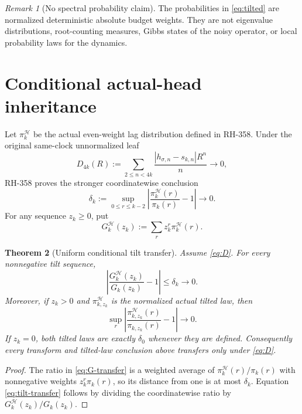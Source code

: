\documentclass[11pt]{article}
\newtheorem{theorem}{Theorem}[section]
\theoremstyle{remark}
\newtheorem{remark}[theorem]{Remark}
\newcommand{\cH}{\mathcal H}
\begin{document}
\begin{remark}[No spectral probability claim]
The probabilities in \eqref{eq:tilted} are normalized deterministic absolute
budget weights.  They are not eigenvalue distributions, root-counting
measures, Gibbs states of the noisy operator, or local probability laws for
the dynamics.
\end{remark}

\section{Conditional actual-head inheritance}

Let $\pi_k^{\cH}$ be the actual even-weight lag distribution defined in
RH-358.  Under the original same-clock unnormalized leaf
\begin{equation}\label{eq:D}
 D_{4k}(R):=\sum_{2\le n<4k}
 \frac{|h_{\sigma,n}-s_{k,n}|R^n}{n}\longrightarrow0,
\end{equation}
RH-358 proves the stronger coordinatewise conclusion
\begin{equation}\label{eq:coordinate-transfer}
 \delta_k:=\sup_{0\le r\le k-2}
 \left|\frac{\pi_k^{\cH}(r)}{\pi_k(r)}-1\right|\longrightarrow0.
\end{equation}
For any sequence $z_k\ge0$, put
\begin{equation}\label{eq:actual-G}
 G_k^{\cH}(z_k):=\sum_rz_k^r\pi_k^{\cH}(r).
\end{equation}

\begin{theorem}[Uniform conditional tilt transfer]\label{thm:conditional}
Assume \eqref{eq:D}.  For every nonnegative tilt sequence,
\begin{equation}\label{eq:G-transfer}
 \left|\frac{G_k^{\cH}(z_k)}{G_k(z_k)}-1\right|\le\delta_k\longrightarrow0.
\end{equation}
Moreover, if $z_k>0$ and $\pi_{k,z_k}^{\cH}$ is the normalized actual tilted
law, then
\begin{equation}\label{eq:tilt-transfer}
 \sup_r\left|
 \frac{\pi_{k,z_k}^{\cH}(r)}{\pi_{k,z_k}(r)}-1
 \right|\longrightarrow0.
\end{equation}
If $z_k=0$, both tilted laws are exactly $\delta_0$ whenever they are defined.
Consequently every transform and tilted-law conclusion above transfers only
under \eqref{eq:D}.
\end{theorem}

\begin{proof}
The ratio in \eqref{eq:G-transfer} is a weighted average of
$\pi_k^{\cH}(r)/\pi_k(r)$ with nonnegative weights $z_k^r\pi_k(r)$, so its
distance from one is at most $\delta_k$.  Equation \eqref{eq:tilt-transfer}
follows by dividing the coordinatewise ratio by
$G_k^{\cH}(z_k)/G_k(z_k)$.
\end{proof}
\end{document}
